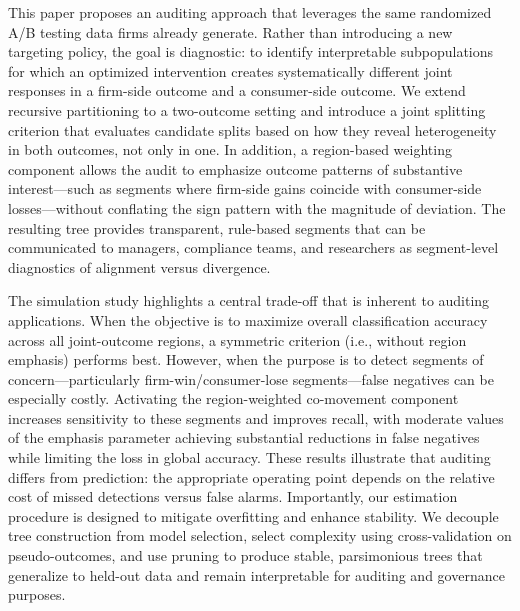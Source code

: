 \documentclass[11pt,letterpaper,english]{article}
\theoremstyle{definition}
\theoremstyle{definition}
\begin{document}
\begin{bibunit}
This paper proposes an auditing approach that leverages the same randomized A/B testing data firms already generate. Rather than introducing a new targeting policy, the goal is diagnostic: to identify interpretable subpopulations for which an optimized intervention creates systematically different joint responses in a firm-side outcome and a consumer-side outcome. We extend recursive partitioning to a two-outcome setting and introduce a joint splitting criterion that evaluates candidate splits based on how they reveal heterogeneity in both outcomes, not only in one. In addition, a region-based weighting component allows the audit to emphasize outcome patterns of substantive interest—such as segments where firm-side gains coincide with consumer-side losses—without conflating the sign pattern with the magnitude of deviation. The resulting tree provides transparent, rule-based segments that can be communicated to managers, compliance teams, and researchers as segment-level diagnostics of alignment versus divergence.

The simulation study highlights a central trade-off that is inherent to auditing applications. When the objective is to maximize overall classification accuracy across all joint-outcome regions, a symmetric criterion (i.e., without region emphasis) performs best. However, when the purpose is to detect segments of concern—particularly firm-win/consumer-lose segments—false negatives can be especially costly. Activating the region-weighted co-movement component increases sensitivity to these segments and improves recall, with moderate values of the emphasis parameter achieving substantial reductions in false negatives while limiting the loss in global accuracy. These results illustrate that auditing differs from prediction: the appropriate operating point depends on the relative cost of missed detections versus false alarms. Importantly, our estimation procedure is designed to mitigate overfitting and enhance stability. We decouple tree construction from model selection, select complexity using cross-validation on pseudo-outcomes, and use pruning to produce stable, parsimonious trees that generalize to held-out data and remain interpretable for auditing and governance purposes.


\end{bibunit}
\end{document}
